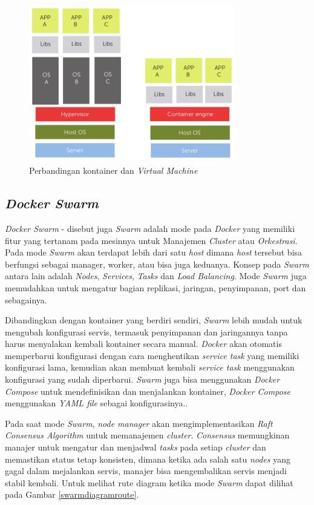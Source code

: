 		\begin{figure}[H]
			\centering
			\includegraphics[width=9cm,height=7cm]{Images/C-2/containervm.png}
			\caption{Perbandingan kontainer dan \textit{Virtual Machine}\cite{docker_2}}
			\label{containervm}
		\end{figure}
	
		\subsection{\textit{Docker Swarm}}
			\textit{Docker Swarm} - disebut juga \textit{Swarm} adalah mode pada \textit{Docker} yang memiliki fitur yang tertanam pada mesinnya untuk Manajemen \textit{Cluster} atau \textit{Orkestrasi}. Pada mode \textit{Swarm} akan terdapat lebih dari satu \textit{host} dimana \textit{host} tersebut bisa berfungsi sebagai manager, worker, atau bisa juga keduanya. Konsep pada \textit{Swarm} antara lain adalah \textit{Nodes}, \textit{Services}, \textit{Tasks} dan \textit{Load Balancing}. Mode \textit{Swarm} juga memudahkan untuk mengatur bagian replikasi, jaringan, penyimpanan, port dan sebagainya.
			
			\indent Dibandingkan dengan kontainer yang berdiri sendiri, \textit{Swarm} lebih mudah untuk mengubah konfigurasi servis, termasuk penyimpanan dan jaringannya tanpa harus menyalakan kembali kontainer secara manual. \textit{Docker} akan otomatis memperbarui konfigurasi dengan cara menghentikan \textit{service task} yang memiliki konfigurasi lama, kemudian akan membuat kembali \textit{service task} menggunakan konfigurasi yang sudah diperbarui. \textit{Swarm} juga bisa menggunakan \textit{Docker Compose} untuk mendefinisikan dan menjalankan kontainer, \textit{Docker Compose} menggunakan \textit{YAML file} sebagai konfigurasinya.\cite{docker_swarm}.
			
			\indent Pada saat mode \textit{Swarm}, \textit{node manager} akan mengimplementasikan \textit{Raft Consensus Algorithm} untuk memanajemen \textit{cluster}. \textit{Consensus} memungkinan manajer untuk mengatur dan menjadwal \textit{tasks} pada setiap \textit{cluster} dan memastikan status tetap konsisten, dimana ketika ada salah satu \textit{nodes} yang gagal dalam mejalankan servis, manajer bisa mengembalikan servis menjadi stabil kembali\cite{docker_swarm_raft}. Untuk melihat rute diagram ketika mode \textit{Swarm} dapat dilihat pada Gambar \ref{swarmdiagramroute}.
			
